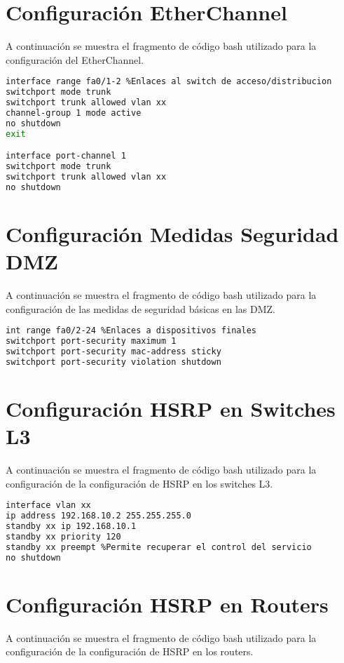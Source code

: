 \section{Configuración EtherChannel}\label{anexo:etherchannel}
A continuación se muestra el fragmento de código bash utilizado para la configuración del EtherChannel.

\begin{lstlisting}[language=Bash, caption={Configuración EtherChannel}]
interface range fa0/1-2 %Enlaces al switch de acceso/distribucion
switchport mode trunk 
switchport trunk allowed vlan xx 
channel-group 1 mode active 
no shutdown 
exit

interface port-channel 1 
switchport mode trunk 
switchport trunk allowed vlan xx
no shutdown 
\end{lstlisting}

\section{Configuración Medidas Seguridad DMZ}\label{anexo:dmz}
A continuación se muestra el fragmento de código bash utilizado para la configuración de las medidas de seguridad básicas en las DMZ.

\begin{lstlisting}[language=Bash, caption={Configuración Medidas Seguridad DMZ}]
int range fa0/2-24 %Enlaces a dispositivos finales
switchport port-security maximum 1 
switchport port-security mac-address sticky 
switchport port-security violation shutdown 
\end{lstlisting}

\section{Configuración HSRP en Switches L3}\label{anexo:hsrpL3}
A continuación se muestra el fragmento de código bash utilizado para la configuración de la configuración de HSRP en los switches L3.

\begin{lstlisting}[language=Bash, caption={Configuración HSRP en Switches L3}]
interface vlan xx 
ip address 192.168.10.2 255.255.255.0 
standby xx ip 192.168.10.1 
standby xx priority 120 
standby xx preempt %Permite recuperar el control del servicio
no shutdown 
\end{lstlisting}

\section{Configuración HSRP en Routers}\label{anexo:hsrpRou}
A continuación se muestra el fragmento de código bash utilizado para la configuración de la configuración de HSRP en los routers.


